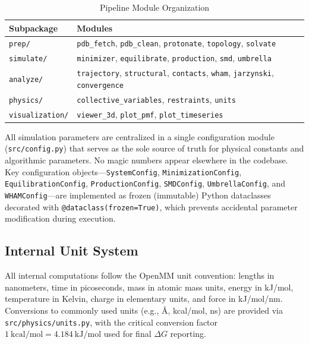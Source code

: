 \documentclass[conference]{IEEEtran}
\begin{document}
\begin{table}[H]
  \centering
  \caption{Pipeline Module Organization}
  \label{tab:modules}
  \begin{tabular}{@{}lp{5.2cm}@{}}
    \toprule
    \textbf{Subpackage} & \textbf{Modules} \\
    \midrule
    \texttt{prep/} & \texttt{pdb\_fetch}, \texttt{pdb\_clean},
      \texttt{protonate}, \texttt{topology}, \texttt{solvate} \\
    \texttt{simulate/} & \texttt{minimizer}, \texttt{equilibrate},
      \texttt{production}, \texttt{smd}, \texttt{umbrella} \\
    \texttt{analyze/} & \texttt{trajectory}, \texttt{structural},
      \texttt{contacts}, \texttt{wham}, \texttt{jarzynski},
      \texttt{convergence} \\
    \texttt{physics/} & \texttt{collective\_variables},
      \texttt{restraints}, \texttt{units} \\
    \texttt{visualization/} & \texttt{viewer\_3d}, \texttt{plot\_pmf},
      \texttt{plot\_timeseries} \\
    \bottomrule
  \end{tabular}
\end{table}

All simulation parameters are centralized in a single configuration module
(\texttt{src/config.py}) that serves as the sole source of truth for
physical constants and algorithmic parameters.  No magic numbers appear
elsewhere in the codebase.  Key configuration objects---\texttt{SystemConfig},
\texttt{MinimizationConfig}, \texttt{EquilibrationConfig},
\texttt{ProductionConfig}, \texttt{SMDConfig}, \texttt{UmbrellaConfig}, and
\texttt{WHAMConfig}---are implemented as frozen (immutable) Python
dataclasses decorated with \texttt{@dataclass(frozen=True)}, which prevents
accidental parameter modification during execution.

\subsection{Internal Unit System}\label{sec:units}

All internal computations follow the OpenMM unit convention: lengths in
nanometers, time in picoseconds, mass in atomic mass units, energy in
kJ/mol, temperature in Kelvin, charge in elementary units, and force in
kJ/mol/nm.  Conversions to commonly used units (e.g., \AA, kcal/mol, ns)
are provided via \texttt{src/physics/units.py}, with the critical
conversion factor $1~\mathrm{kcal/mol} = 4.184~\mathrm{kJ/mol}$ used for
final $\Delta G$ reporting.
\end{document}

